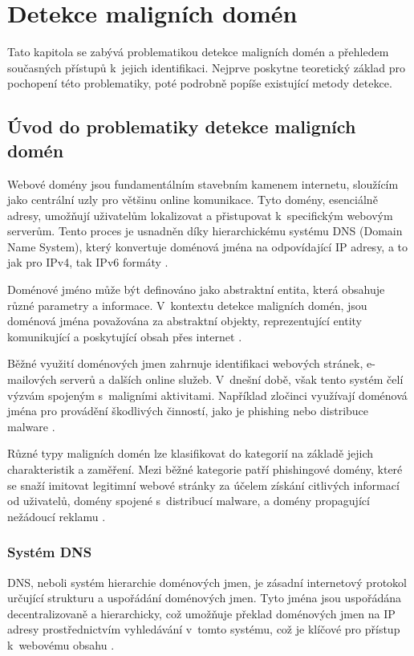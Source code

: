 \chapter{Detekce maligních domén}
\label{chapter:2}
Tato kapitola se zabývá problematikou detekce maligních domén a přehledem současných přístupů k~jejich identifikaci. Nejprve poskytne teoretický základ pro pochopení této problematiky, poté podrobně popíše existující metody detekce.


\section{Úvod do problematiky detekce maligních domén}

Webové domény jsou fundamentálním stavebním kamenem internetu, sloužícím jako centrální uzly pro většinu online komunikace. Tyto domény, esenciálně adresy, umožňují uživatelům lokalizovat a přistupovat k~specifickým webovým serverům. Tento proces je usnadněn díky hierarchickému systému DNS (Domain Name System), který konvertuje doménová jména na odpovídající IP adresy, a to jak pro IPv4, tak IPv6 formáty \cite{mockdomain}.

Doménové jméno může být definováno jako abstraktní entita, která obsahuje různé parametry a informace. V~kontextu detekce maligních domén, jsou doménová jména považována za abstraktní objekty, reprezentující entity komunikující a poskytující obsah přes internet \cite{chu2010tweeting}.

Běžné využití doménových jmen zahrnuje identifikaci webových stránek, e-mailových serverů a dalších online služeb. V~dnešní době, však tento systém čelí výzvám spojeným s~maligními aktivitami. Například zločinci využívají doménová jména pro provádění škodlivých činností, jako je phishing nebo distribuce malware \cite{provos2007virtual}.

Různé typy maligních domén lze klasifikovat do kategorií na základě jejich charakteristik a zaměření. Mezi běžné kategorie patří phishingové domény, které se snaží imitovat legitimní webové stránky za účelem získání citlivých informací od uživatelů, domény spojené s~distribucí malware, a domény propagující nežádoucí reklamu \cite{moore-clayton}.

\subsection{Systém DNS} \label{DNS_section}


DNS, neboli systém hierarchie doménových jmen, je zásadní internetový protokol určující strukturu a uspořádání doménových jmen. Tyto jména jsou uspořádána decentralizovaně a hierarchicky, což umožňuje překlad doménových jmen na IP adresy prostřednictvím vyhledávání v~tomto systému, což je klíčové pro přístup k~webovému obsahu \cite{postel1983domain2}.

